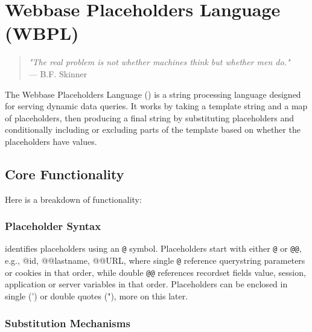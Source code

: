 
\chapter{Webbase Placeholders Language (WBPL)}
\label{chap:wbpl}

\begin{quote}
\textit{"The real problem is not whether machines think but whether men do."} \\
— B.F. Skinner
\end{quote}

The Webbase Placeholders Language (\wbpl{}) is a string processing language designed for serving dynamic data queries. It works by taking a template string and a map of placeholders, then producing a final string by substituting placeholders and conditionally including or excluding parts of the template based on whether the placeholders have values.

\section{Core Functionality}
\label{sec:wbpl-core}

Here is a breakdown of \wbpl{} functionality:

\subsection{Placeholder Syntax}

\wbpl{} identifies placeholders using an \texttt{@} symbol. Placeholders start with either \texttt{@} or \texttt{@@}, e.g., @id, @@lastname, @@URL, where single \texttt{@} reference querystring parameters or cookies in that order, while double \texttt{@@} references recordset fields value, session, application or server variables in that order. Placeholders can be enclosed in single (') or double quotes ("), more on this later.

\subsection{Substitution Mechanisms}

